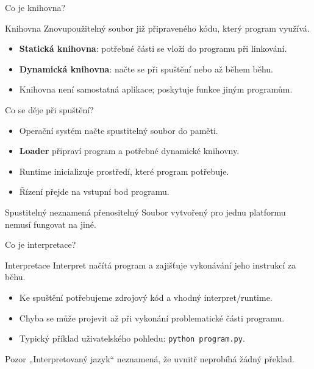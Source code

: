 \documentclass[aspectratio=169]{beamer}
\newcommand{\term}[1]{\textcolor{CodeBlue}{\textbf{#1}}}
\begin{document}
\begin{frame}{Co je knihovna?}
  \begin{block}{Knihovna}
    Znovupoužitelný soubor již připraveného kódu, který program využívá.
  \end{block}
  \begin{itemize}
    \item \term{Statická knihovna}: potřebné části se vloží do programu při linkování.
    \item \term{Dynamická knihovna}: načte se při spuštění nebo až během běhu.
    \item Knihovna není samostatná aplikace; poskytuje funkce jiným programům.
  \end{itemize}
\end{frame}

\begin{frame}{Co se děje při spuštění?}
  \begin{itemize}
    \item Operační systém načte spustitelný soubor do paměti.
    \item \term{Loader} připraví program a potřebné dynamické knihovny.
    \item Runtime inicializuje prostředí, které program potřebuje.
    \item Řízení přejde na vstupní bod programu.
  \end{itemize}
  \begin{alertblock}{Spustitelný neznamená přenositelný}
    Soubor vytvořený pro jednu platformu nemusí fungovat na jiné.
  \end{alertblock}
\end{frame}

\begin{frame}{Co je interpretace?}
  \begin{block}{Interpretace}
    Interpret načítá program a zajišťuje vykonávání jeho instrukcí za běhu.
  \end{block}
  \begin{itemize}
    \item Ke spuštění potřebujeme zdrojový kód a vhodný interpret/runtime.
    \item Chyba se může projevit až při vykonání problematické části programu.
    \item Typický příklad uživatelského pohledu: \texttt{python program.py}.
  \end{itemize}
  \begin{alertblock}{Pozor}
    „Interpretovaný jazyk“ neznamená, že uvnitř neprobíhá žádný překlad.
  \end{alertblock}
\end{frame}
\end{document}

